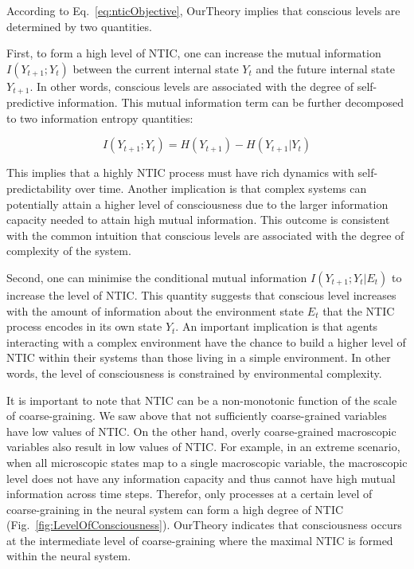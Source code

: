 \documentclass[utf8]{article}
\begin{document}
            According to Eq.~\ref{eq:nticObjective}, \ac{OurTheory} implies that conscious levels are determined by two quantities. 
            
            First, to form a high level of NTIC, one can increase the mutual information $I(Y_{t+1};Y_{t})$ between the current internal state $Y_t$ and the future internal state $Y_{t+1}$. In other words, conscious levels are associated with the degree of self-predictive information. This mutual information term can be further decomposed to two information entropy quantities: 
            
            \begin{equation}
            \label{eq:SelfEntropy}
            I(Y_{t+1};Y_{t}) = H(Y_{t+1}) - H(Y_{t+1}|Y_t)
            \end{equation}
            
            This implies that a highly NTIC process must have rich dynamics with self-predictability over time. Another implication is that complex systems can potentially attain a higher level of consciousness due to the larger information capacity needed to attain high mutual information. This outcome is consistent with the common intuition that conscious levels are associated with the degree of complexity of the system.
    
    	    Second, one can minimise the conditional mutual information $I(Y_{t+1};Y_{t}|E_{t})$ to increase the level of NTIC. This quantity suggests that conscious level increases with the amount of information about the environment state $E_t$ that the NTIC process encodes in its own state $Y_t$. An important implication is that agents interacting with a complex environment have the chance to build a higher level of NTIC within their systems than those living in a simple environment. In other words, the level of consciousness is constrained by environmental complexity. 
    	   
    		It is important to note that NTIC can be a non-monotonic function of the scale of coarse-graining. We saw above that not sufficiently coarse-grained variables have low values of NTIC. On the other hand, overly coarse-grained macroscopic variables  also result in low values of NTIC. For example, in an extreme scenario, when all microscopic states map to a single macroscopic variable, the macroscopic level does not have any information capacity and thus cannot have high mutual information across time steps.  Therefor, only processes at a certain level of coarse-graining in the neural system can form a high degree of NTIC (Fig.~\ref{fig:LevelOfConsciousness}). \ac{OurTheory} indicates that consciousness occurs at the intermediate level of coarse-graining where the maximal NTIC is formed within the neural system. 
    		
\end{document}
